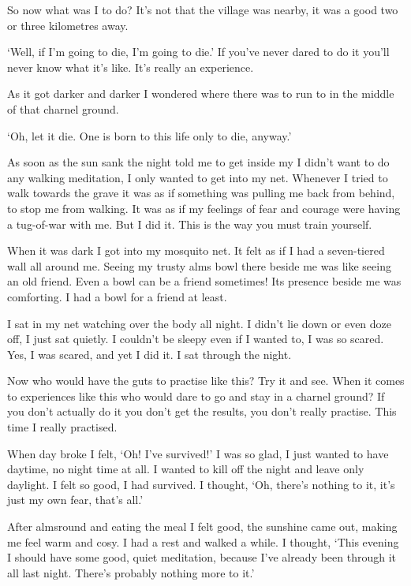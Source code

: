 So now what was I to do? It's not that the village was nearby, it was a good two or three kilometres away.

`Well, if I'm going to die, I'm going to die.' If you've never dared to do it you'll never know what it's like. It's really an experience.

As it got darker and darker I wondered where there was to run to in the middle of that charnel ground.

`Oh, let it die. One is born to this life only to die, anyway.'

As soon as the sun sank the night told me to get inside my \textit{} I didn't want to do any walking meditation, I only wanted to get into my net. Whenever I tried to walk towards the grave it was as if something was pulling me back from behind, to stop me from walking. It was as if my feelings of fear and courage were having a tug-of-war with me. But I did it. This is the way you must train yourself.

When it was dark I got into my mosquito net. It felt as if I had a seven-tiered wall all around me. Seeing my trusty alms bowl there beside me was like seeing an old friend. Even a bowl can be a friend sometimes! Its presence beside me was comforting. I had a bowl for a friend at least.

I sat in my net watching over the body all night. I didn't lie down or even doze off, I just sat quietly. I couldn't be sleepy even if I wanted to, I was so scared. Yes, I was scared, and yet I did it. I sat through the night.

Now who would have the guts to practise like this? Try it and see. When it comes to experiences like this who would dare to go and stay in a charnel ground? If you don't actually do it you don't get the results, you don't really practise. This time I really practised.

When day broke I felt, `Oh! I've survived!' I was so glad, I just wanted to have daytime, no night time at all. I wanted to kill off the night and leave only daylight. I felt so good, I had survived. I thought, `Oh, there's nothing to it, it's just my own fear, that's all.'

After almsround and eating the meal I felt good, the sunshine came out, making me feel warm and cosy. I had a rest and walked a while. I thought, `This evening I should have some good, quiet meditation, because I've already been through it all last night. There's probably nothing more to it.'

